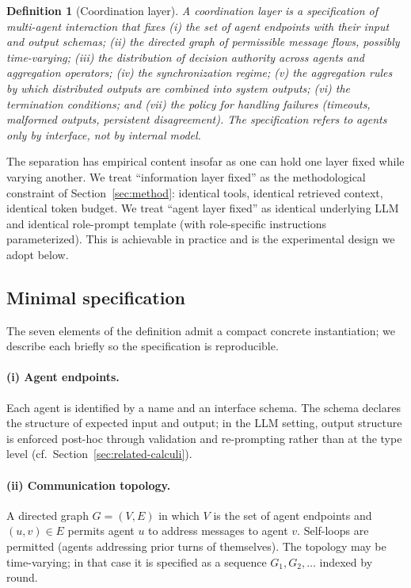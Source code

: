 \documentclass[11pt]{article}
\newtheorem{definition}{Definition}
\begin{document}
\begin{definition}[Coordination layer]
A coordination layer is a specification of multi-agent interaction that fixes (i) the set of agent endpoints with their input and output schemas; (ii) the directed graph of permissible message flows, possibly time-varying; (iii) the distribution of decision authority across agents and aggregation operators; (iv) the synchronization regime; (v) the aggregation rules by which distributed outputs are combined into system outputs; (vi) the termination conditions; and (vii) the policy for handling failures (timeouts, malformed outputs, persistent disagreement). The specification refers to agents only by interface, not by internal model.
\end{definition}

The separation has empirical content insofar as one can hold one layer fixed while varying another. We treat ``information layer fixed'' as the methodological constraint of Section~\ref{sec:method}: identical tools, identical retrieved context, identical token budget. We treat ``agent layer fixed'' as identical underlying LLM and identical role-prompt template (with role-specific instructions parameterized). This is achievable in practice and is the experimental design we adopt below.

\subsection{Minimal specification}
\label{sec:layer-spec}

The seven elements of the definition admit a compact concrete instantiation; we describe each briefly so the specification is reproducible.

\paragraph{(i) Agent endpoints.}
Each agent is identified by a name and an interface schema. The schema declares the structure of expected input and output; in the LLM setting, output structure is enforced post-hoc through validation and re-prompting rather than at the type level (cf.\ Section~\ref{sec:related-calculi}).

\paragraph{(ii) Communication topology.}
A directed graph $G = (V, E)$ in which $V$ is the set of agent endpoints and $(u, v) \in E$ permits agent $u$ to address messages to agent $v$. Self-loops are permitted (agents addressing prior turns of themselves). The topology may be time-varying; in that case it is specified as a sequence $G_1, G_2, \ldots$ indexed by round.
\end{document}

